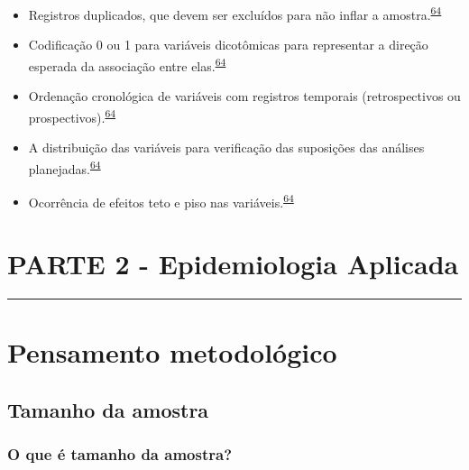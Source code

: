 \documentclass[
]{book}
\begin{document}
\begin{itemize}
\item
  Registros duplicados, que devem ser excluídos para não inflar a amostra.\textsuperscript{\protect\hyperlink{ref-huebner2016}{64}}
\item
  Codificação 0 ou 1 para variáveis dicotômicas para representar a direção esperada da associação entre elas.\textsuperscript{\protect\hyperlink{ref-huebner2016}{64}}
\item
  Ordenação cronológica de variáveis com registros temporais (retrospectivos ou prospectivos).\textsuperscript{\protect\hyperlink{ref-huebner2016}{64}}
\item
  A distribuição das variáveis para verificação das suposições das análises planejadas.\textsuperscript{\protect\hyperlink{ref-huebner2016}{64}}
\item
  Ocorrência de efeitos teto e piso nas variáveis.\textsuperscript{\protect\hyperlink{ref-huebner2016}{64}}
\end{itemize}


\hypertarget{parte-2---epidemiologia-aplicada}{%
\chapter*{\texorpdfstring{\textbf{PARTE 2 - Epidemiologia Aplicada}}{PARTE 2 - Epidemiologia Aplicada}}\label{parte-2---epidemiologia-aplicada}}

\markboth{}{}
\par\noindent\rule{\textwidth}{0.05in}

\hypertarget{pensamento-metodologico}{%
\chapter{\texorpdfstring{\textbf{Pensamento metodológico}}{Pensamento metodológico}}\label{pensamento-metodologico}}

\hypertarget{tamanho-da-amostra}{%
\section{Tamanho da amostra}\label{tamanho-da-amostra}}

\hypertarget{o-que-uxe9-tamanho-da-amostra}{%
\subsection{O que é tamanho da amostra?}\label{o-que-uxe9-tamanho-da-amostra}}
\end{document}
